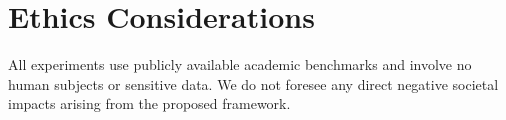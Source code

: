 \documentclass[11pt]{article}
\begin{document}


\section*{Ethics Considerations}
\label{sec:ethics}

All experiments use publicly available academic benchmarks and involve no human subjects or sensitive data. We do not foresee any direct negative societal impacts arising from the proposed framework.




















%




\appendix

%






%
\end{document}
